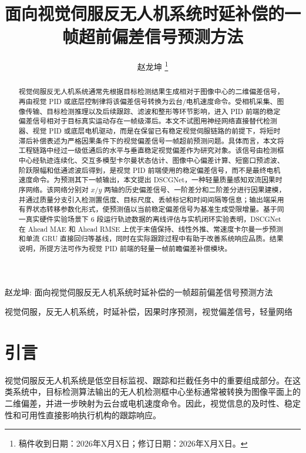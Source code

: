 \documentclass[journal]{IEEEtran}
\begin{document}
\title{面向视觉伺服反无人机系统时延补偿的一帧超前偏差信号预测方法}

\author{赵龙坤%
\thanks{稿件收到日期：2026年X月X日；修订日期：2026年X月X日。}}

%
{赵龙坤: 面向视觉伺服反无人机系统时延补偿的一帧超前偏差信号预测方法}

\maketitle


\begin{abstract}
视觉伺服反无人机系统通常先根据目标检测结果生成相对于图像中心的二维偏差信号，再由视觉 PID 或底层控制律将该偏差信号转换为云台/电机速度命令。受相机采集、图像传输、目标检测推理以及后续跟踪、滤波和整形等环节影响，进入 PID 前端的稳定偏差信号相对于目标真实运动存在一帧级滞后。本文不试图用神经网络直接替代检测器、视觉 PID 或底层电机驱动，而是在保留已有稳定视觉伺服链路的前提下，将短时滞后补偿表述为严格因果条件下的视觉偏差信号一帧超前预测问题。具体而言，本文将工程链路中经过一级低通后的水平与垂直稳定视觉偏差作为研究对象。该信号由检测框中心经轨迹连续化、交互多模型卡尔曼状态估计、图像中心偏差计算、短窗口预滤波、阶跃限幅和低通滤波后得到，是视觉 PID 前端使用的稳定偏差信号，而不是最终电机速度命令。为预测其下一帧输出，本文提出 DSCGNet，一种轻量质量感知双流因果时序网络。该网络分别对 $x/y$ 两轴的历史偏差信号、一阶差分和二阶差分进行因果建模，并通过质量分支引入检测置信度、目标尺度、丢帧标记和时间间隔等信息；输出端采用有界状态转移参数化形式，使预测值以当前稳定偏差信号为基准生成受限增量。基于同一真实硬件实验场景下 6 段运行轨迹数据的离线评估与实机闭环实验表明，DSCGNet 在 Ahead MAE 和 Ahead RMSE 上优于末值保持、线性外推、常速度卡尔曼一步预测和单流 GRU 直接回归等基线，同时在实际跟踪过程中有助于改善系统响应品质。结果说明，所提方法可作为视觉 PID 前端的轻量一帧前瞻偏差补偿模块。
\end{abstract}

\begin{IEEEkeywords}
视觉伺服，反无人机系统，时延补偿，因果时序预测，视觉偏差信号，轻量网络
\end{IEEEkeywords}

\section{引言}
视觉伺服反无人机系统是低空目标监视、跟踪和拦截任务中的重要组成部分\cite{chaumette2006visual,hutchinson1996tutorial,corke2011robotics,shi2021anti}。在这类系统中，目标检测算法输出的无人机检测框中心坐标通常被转换为图像平面上的二维偏差，并进一步映射为云台或电机速度命令。因此，视觉信息的及时性、稳定性和可用性直接影响执行机构的跟踪响应。
\end{document}
